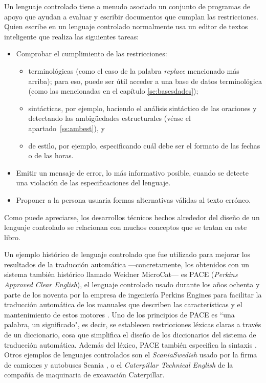 Un lenguaje controlado tiene a menudo asociado un conjunto de programas de apoyo que ayudan a evaluar y escribir documentos que cumplan las restricciones. Quien escribe en un lenguaje controlado normalmente usa un editor de textos inteligente que realiza las siguientes tareas: \begin{itemize} \item Comprobar el cumplimiento de las restricciones: \begin{itemize} \item terminológicas (como el caso de la palabra \emph{replace} mencionado más arriba); para eso, puede ser útil acceder a una base de datos terminológica (como las mencionadas en el capítulo \ref{se:basesdades}); \item sintácticas, por ejemplo, haciendo el análisis sintáctico de las oraciones y detectando las ambigüedades estructurales (véase el apartado~\ref{ss:ambest}), y \item de estilo, por ejemplo, especificando cuál debe ser el formato de las fechas o de las horas. \end{itemize} \item Emitir un mensaje de error, lo más informativo posible, cuando se detecte una violación de las especificaciones del lenguaje. \item Proponer a la persona usuaria formas alternativas válidas al texto erróneo. \end{itemize} Como puede apreciarse, los desarrollos técnicos hechos alrededor del diseño de un lenguaje controlado se relacionan con muchos conceptos que se tratan en este libro. 

Un ejemplo histórico de lenguaje controlado que fue utilizado para mejorar los resultados de la traducción automática ---concretamente, los obtenidos con un sistema también histórico llamado Weidner MicroCat--- es PACE (\emph{Perkins Approved Clear English}), el lenguaje controlado usado durante los años ochenta y parte de los noventa por la empresa de ingeniería Perkins Engines para facilitar la traducción automática de los manuales que describen las características y el mantenimiento de estos motores \citep{newton92b,douglas96p}. Uno de los principios de PACE es ``una palabra, un significado", es decir, se establecen restricciones léxicas claras a través de un diccionario, cosa que simplifica el diseño de los diccionarios del sistema de traducción automática. Además del léxico, PACE también especifica la sintaxis \cite[secció 8.3]{arnold94b}. Otros ejemplos de lenguajes controlados son el \emph{ScaniaSwedish} usado por la firma de camiones y autobuses Scania \citep{almqvist96p}, o el {\em Caterpillar Technical English} de la compañía de maquinaria de excavación Caterpillar. 

